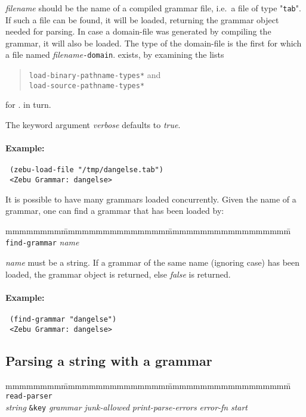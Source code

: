 {\em filename} should be the name of a compiled grammar file, i.e.\ a
file of type "{\tt tab}".  If such a file can be found, it will be
loaded, returning the grammar object needed for parsing.  In case a
domain-file was generated by compiling the grammar, it will also be
loaded.  The type of the domain-file is the first for which a file
named {\em filename}{\tt -domain}. exists, by examining
the lists
\begin{quote}
{\tt *load-binary-pathname-types*} and\\
{\tt *load-source-pathname-types*}
\end{quote} 
for . in turn.

  The keyword argument {\em verbose} defaults to {\em true}.

\paragraph {Example:}
{\tt \begin{verbatim}
 (zebu-load-file "/tmp/dangelse.tab")
 <Zebu Grammar: dangelse>
\end{verbatim}}

It is possible to have many grammars loaded concurrently.  Given the name
of a grammar, one can find a grammar that has been loaded by:

\begin{tabbing}
mmmmmmmm\=mmmmmmmmmmmmmmm\=mmmmmmmmmmmmmmmmmm\=\kill
{\tt find-grammar} {\em name} \>\> 
\end{tabbing}


{\em name} must be a string.  If a grammar of the same name (ignoring
case) has been loaded, the grammar object is returned, else {\em
false} is returned.

\paragraph {Example:}
{\tt \begin{verbatim}
 (find-grammar "dangelse")
 <Zebu Grammar: dangelse>
     \end{verbatim}}

\subsection{Parsing a string with a grammar}

\begin{tabbing}
mmmmmmmm\=mmmmmmmmmmmmmmm\=mmmmmmmmmmmmmmmmmm\=\kill
{\tt read-parser} \>\> \\
   \> {\em string} {\tt \&key} {\em grammar} {\em junk-allowed} {\em
print-parse-errors} {\em error-fn}  {\em start}
\end{tabbing}

